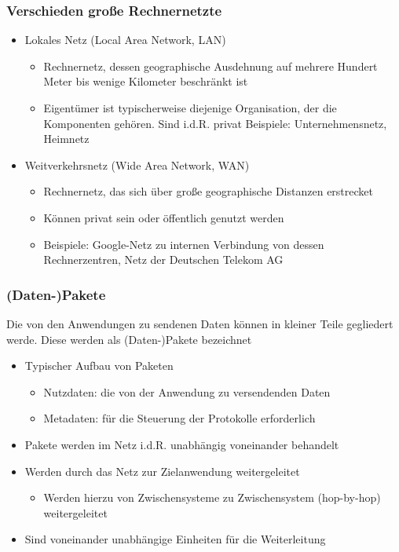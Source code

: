     \subsubsection{Verschieden große Rechnernetzte}
      \begin{itemize}
        \item Lokales Netz (Local Area Network, LAN)
          \begin{itemize}
            \item Rechnernetz, dessen geographische Ausdehnung auf mehrere Hundert Meter bis wenige
              Kilometer beschränkt ist
            \item Eigentümer ist typischerweise diejenige Organisation, der die Komponenten gehören.
              Sind i.d.R. privat
              Beispiele: Unternehmensnetz, Heimnetz
          \end{itemize}
        \item Weitverkehrsnetz (Wide Area Network, WAN)
          \begin{itemize}
            \item Rechnernetz, das sich über große geographische Distanzen erstrecket
            \item Können privat sein oder öffentlich genutzt werden
            \item Beispiele: Google-Netz zu internen Verbindung von dessen Rechnerzentren, Netz der
              Deutschen Telekom AG
          \end{itemize}
      \end{itemize}
    \subsubsection{(Daten-)Pakete}
      Die von den Anwendungen zu sendenen Daten können in kleiner Teile gegliedert werde. Diese werden
      als (Daten-)Pakete bezeichnet
      \begin{itemize}
        \item Typischer Aufbau von Paketen
          \begin{itemize}
            \item Nutzdaten: die von der Anwendung zu versendenden Daten
            \item Metadaten: für die Steuerung der Protokolle erforderlich
          \end{itemize}
        \item Pakete werden im Netz i.d.R. unabhängig voneinander behandelt
        \item Werden durch das Netz zur Zielanwendung weitergeleitet
          \begin{itemize}
            \item Werden hierzu von Zwischensysteme zu Zwischensystem (hop-by-hop) weitergeleitet
          \end{itemize}
        \item Sind voneinander unabhängige Einheiten für die Weiterleitung
      \end{itemize}
